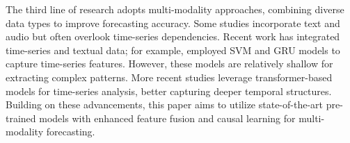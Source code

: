 

The third line of research adopts multi-modality approaches, combining diverse data types to improve forecasting accuracy. Some studies incorporate text and audio \cite{qin-yang-2019-say,10.1145/3366423.3380128} but often overlook time-series dependencies. Recent work has integrated time-series and textual data; for example, \cite{10.1145/3394171.3413752,sawhney-etal-2020-deep} employed SVM and GRU models to capture time-series features. However, these models are relatively shallow for extracting complex patterns. More recent studies \cite{lee2024moat, Jia_Wang_Zheng_Cao_Liu_2024} leverage transformer-based models for time-series analysis, better capturing deeper temporal structures. Building on these advancements, this paper aims to utilize state-of-the-art pre-trained models with enhanced feature fusion and causal learning for multi-modality forecasting.

